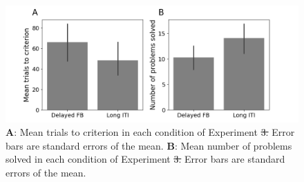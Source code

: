 \documentclass[doc, floatsintext]{apa7}
\providecommand{\DIFadd}[1]{{\protect\color{blue}\uwave{#1}}} %
\providecommand{\DIFdel}[1]{{\protect\color{red}\sout{#1}}}                      %
\providecommand{\DIFdelbegin}{} %
\providecommand{\DIFdelend}{} %
\providecommand{\DIFaddFL}[1]{\DIFadd{#1}} %
\providecommand{\DIFdelFL}[1]{\DIFdel{#1}} %
\providecommand{\DIFaddbeginFL}{} %
\providecommand{\DIFaddendFL}{} %
\providecommand{\DIFdelbeginFL}{} %
\providecommand{\DIFdelendFL}{} %
\newcommand{\DIFscaledelfig}{0.5}
\newlength{\DIFdelgraphicswidth} %
\newlength{\DIFdelgraphicsheight} %
\newcommand{\DIFaddincludegraphics}[2][]{{\color{blue}\fbox{\DIFOincludegraphics[#1]{#2}}}} %
\newcommand{\DIFdelincludegraphics}[2][]{%
\sbox{\DIFdelgraphicsbox}{\DIFOincludegraphics[#1]{#2}}%
\settoboxwidth{\DIFdelgraphicswidth}{\DIFdelgraphicsbox} %
\settoboxtotalheight{\DIFdelgraphicsheight}{\DIFdelgraphicsbox} %
\scalebox{\DIFscaledelfig}{%
\parbox[b]{\DIFdelgraphicswidth}{\usebox{\DIFdelgraphicsbox}\\[-\baselineskip] \rule{\DIFdelgraphicswidth}{0em}}\llap{\resizebox{\DIFdelgraphicswidth}{\DIFdelgraphicsheight}{%
\setlength{\unitlength}{\DIFdelgraphicswidth}%
\begin{picture}(1,1)%
\thicklines\linethickness{2pt} %
{\color[rgb]{1,0,0}\put(0,0){\framebox(1,1){}}}%
{\color[rgb]{1,0,0}\put(0,0){\line( 1,1){1}}}%
{\color[rgb]{1,0,0}\put(0,1){\line(1,-1){1}}}%
\end{picture}%
}\hspace*{3pt}}} %
} %
\DeclareRobustCommand{\DIFdelbegin}{\DIFOdelbegin \let\includegraphics\DIFdelincludegraphics} %
\DeclareRobustCommand{\DIFdelend}{\DIFOaddend \let\includegraphics\DIFOincludegraphics} %
\DeclareRobustCommand{\DIFaddbeginFL}{\DIFOaddbeginFL \let\includegraphics\DIFaddincludegraphics} %
\DeclareRobustCommand{\DIFaddendFL}{\DIFOaddendFL \let\includegraphics\DIFOincludegraphics} %
\DeclareRobustCommand{\DIFdelbeginFL}{\DIFOdelbeginFL \let\includegraphics\DIFdelincludegraphics} %
\DeclareRobustCommand{\DIFdelendFL}{\DIFOaddendFL \let\includegraphics\DIFOincludegraphics} %
\begin{document}
\DIFdelbegin %


\DIFdelend \begin{figure}
  \centering
  \includegraphics[width=.8\textwidth]{../figures/fig_exp_2_t2c.png}
    \caption{
        \textbf{A}: Mean trials to criterion in each
        condition of Experiment \DIFdelbeginFL \DIFdelFL{3. }\DIFdelendFL \DIFaddbeginFL \DIFaddFL{2. }\DIFaddendFL Error bars are standard
        errors of the mean.
        \textbf{B}: Mean number of problems solved in each
        condition of Experiment \DIFdelbeginFL \DIFdelFL{3. }\DIFdelendFL \DIFaddbeginFL \DIFaddFL{2. }\DIFaddendFL Error bars are standard
        errors of the mean.
}
  \label{fig_exp_2_t2c}
\end{figure}
\end{document}
